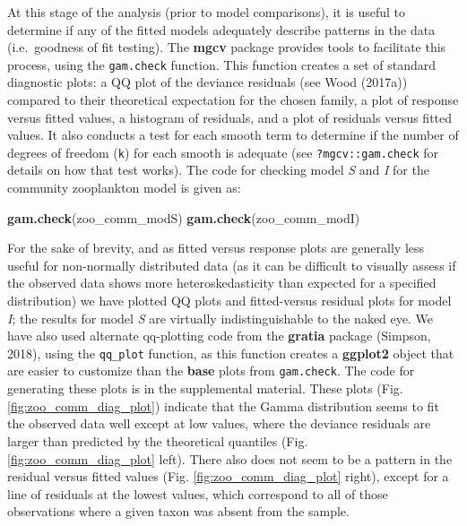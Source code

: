 \documentclass[12pt]{article}
\newenvironment{Shaded}{\begin{snugshade}}{\end{snugshade}}
\newcommand{\KeywordTok}[1]{\textcolor[rgb]{0.13,0.29,0.53}{\textbf{#1}}}
\newcommand{\NormalTok}[1]{#1}
\begin{document}
At this stage of the analysis (prior to model comparisons), it is useful
to determine if any of the fitted models adequately describe patterns in
the data (i.e.~goodness of fit testing). The \textbf{mgcv} package
provides tools to facilitate this process, using the \texttt{gam.check}
function. This function creates a set of standard diagnostic plots: a QQ
plot of the deviance residuals (see Wood (2017a)) compared to their
theoretical expectation for the chosen family, a plot of response versus
fitted values, a histogram of residuals, and a plot of residuals versus
fitted values. It also conducts a test for each smooth term to determine
if the number of degrees of freedom (\texttt{k}) for each smooth is
adequate (see \texttt{?mgcv::gam.check} for details on how that test
works). The code for checking model \emph{S} and \emph{I} for the
community zooplankton model is given as:

\begin{Shaded}
\begin{Highlighting}[]
\KeywordTok{gam.check}\NormalTok{(zoo_comm_modS)}
\KeywordTok{gam.check}\NormalTok{(zoo_comm_modI)}
\end{Highlighting}
\end{Shaded}

For the sake of brevity, and as fitted versus response plots are
generally less useful for non-normally distributed data (as it can be
difficult to visually assess if the observed data shows more
heteroskedasticity than expected for a specified distribution) we have
plotted QQ plots and fitted-versus residual plots for model \emph{I};
the results for model \emph{S} are virtually indistinguishable to the
naked eye. We have also used alternate qq-plotting code from the
\textbf{gratia} package (Simpson, 2018), using the \texttt{qq\_plot}
function, as this function creates a \textbf{ggplot2} object that are
easier to customize than the \textbf{base} plots from
\texttt{gam.check}. The code for generating these plots is in the
supplemental material. These plots (Fig. \ref{fig:zoo_comm_diag_plot})
indicate that the Gamma distribution seems to fit the observed data well
except at low values, where the deviance residuals are larger than
predicted by the theoretical quantiles (Fig.
\ref{fig:zoo_comm_diag_plot} left). There also does not seem to be a
pattern in the residual versus fitted values (Fig.
\ref{fig:zoo_comm_diag_plot} right), except for a line of residuals at
the lowest values, which correspond to all of those observations where a
given taxon was absent from the sample.
\end{document}
